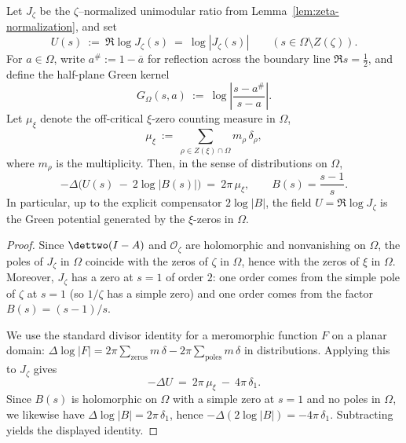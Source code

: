 \begin{lemma}[Green potential representation for \(U=\Re\log J_\zeta\)]\label{lem:green-potential-Jzeta}
Let \(J_\zeta\) be the \(\zeta\)–normalized unimodular ratio from Lemma~\ref{lem:zeta-normalization}, and set
\[
  U(s)\ :=\ \Re\log J_\zeta(s)\ =\ \log|J_\zeta(s)|
  \qquad (s\in \Omega\setminus Z(\zeta)).
\]
For \(a\in\Omega\), write \(a^\#:=1-\overline a\) for reflection across the boundary line \(\Re s=\tfrac12\), and define the half-plane Green kernel
\[
  G_\Omega(s,a)\ :=\ \log\left|\frac{s-a^\#}{s-a}\right|.
\]
Let \(\mu_\xi\) denote the off-critical \(\xi\)-zero counting measure in \(\Omega\),
\[
  \mu_\xi\ :=\ \sum_{\rho\in Z(\xi)\cap\Omega} m_\rho\,\delta_\rho,
\]
where \(m_\rho\) is the multiplicity.
Then, in the sense of distributions on \(\Omega\),
\[
  -\Delta\Big(U(s)\ -\ 2\log|B(s)|\Big)\ =\ 2\pi\,\mu_\xi,
  \qquad B(s)=\frac{s-1}{s}.
\]
In particular, up to the explicit compensator \(2\log|B|\), the field \(U=\Re\log J_\zeta\) is the Green potential generated by the \(\xi\)-zeros in \(\Omega\).
\end{lemma}
\begin{proof}
Since \(\dettwo(I-A)\) and \(\mathcal O_\zeta\) are holomorphic and nonvanishing on \(\Omega\), the poles of \(J_\zeta\) in \(\Omega\) coincide with the zeros of \(\zeta\) in \(\Omega\), hence with the zeros of \(\xi\) in \(\Omega\).
Moreover, \(J_\zeta\) has a zero at \(s=1\) of order \(2\): one order comes from the simple pole of \(\zeta\) at \(s=1\) (so \(1/\zeta\) has a simple zero) and one order comes from the factor \(B(s)=(s-1)/s\).

We use the standard divisor identity for a meromorphic function \(F\) on a planar domain:
\(\Delta\log|F| = 2\pi\sum_{\text{zeros}} m\,\delta - 2\pi\sum_{\text{poles}} m\,\delta\)
in distributions.
Applying this to \(J_\zeta\) gives
\[
  -\Delta U \ =\ 2\pi\,\mu_\xi\ -\ 4\pi\,\delta_{1}.
\]
Since \(B(s)\) is holomorphic on \(\Omega\) with a simple zero at \(s=1\) and no poles in \(\Omega\), we likewise have \(\Delta\log|B| = 2\pi\,\delta_{1}\), hence
\(-\Delta(2\log|B|)=-4\pi\,\delta_{1}\).
Subtracting yields the displayed identity.
\end{proof}

